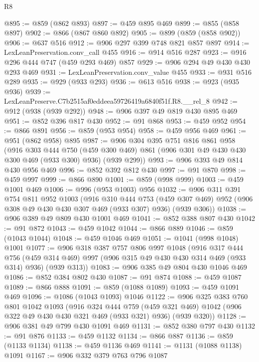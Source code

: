 \begin{lexlean}{R8}
\begin{coremodule}
@895 := @859 (@862 @893)
@897 := @459 @895 @469
@899 := @855 (@858 @897)
@902 := @866 (@867 @860 @892)
@905 := @899 (@859 (@858 @902))
@906 := @637 @516
@912 := @906 @297 @399 @748 @821 @857 @897
@914 := LexLeanPreservation.conv_call @455
@916 := @914 @516 @287
@923 := @916 @296 @444 @747 (@459 @293 @469) @857
@929 := @906 @294 @49 @430 @430 @293 @469
@931 := LexLeanPreservation.conv_value @455
@933 := @931 @516 @289
@935 := @929 (@933 @293)
@936 := @613 @516
@938 := @923 (@935 @936)
@939 := LexLeanPreserve.C7b2515af0eddeea59726419a6840f51f.R8.__rel_8
@942 := @912 (@938 (@939 @292))
@948 := @906 @397 @49 @819 @430 @895 @469
@951 := @852 @396 @817 @430
@952 := @91 @868
@953 := @459 @952
@954 := @866 @891
@956 := @859 (@953 @954)
@958 := @459 @956 @469
@961 := @951 (@862 @958) @895
@987 := @906
    @304
    @395
    @751
    @816
    @861
    @958
    (@916
      @303
      @444
      @750
      (@459 @300 @469)
      @861
      (@906 @301 @49 @430 @430 @300 @469 (@933 @300) @936)
      (@939 @299))
@993 := @906 @393 @49 @814 @430 @956 @469
@996 := @852 @392 @812 @430
@997 := @91 @870
@998 := @459 @997
@999 := @866 @890
@1001 := @859 (@998 @999)
@1003 := @459 @1001 @469
@1006 := @996 (@953 @1003) @956
@1032 := @906
    @311
    @391
    @754
    @811
    @952
    @1003
    (@916
      @310
      @444
      @753
      (@459 @307 @469)
      @952
      (@906 @308 @49 @430 @430 @307 @469 (@933 @307) @936)
      (@939 @306))
@1038 := @906 @389 @49 @809 @430 @1001 @469
@1041 := @852 @388 @807 @430
@1042 := @91 @872
@1043 := @459 @1042
@1044 := @866 @889
@1046 := @859 (@1043 @1044)
@1048 := @459 @1046 @469
@1051 := @1041 (@998 @1048) @1001
@1077 := @906
    @318
    @387
    @757
    @806
    @997
    @1048
    (@916
      @317
      @444
      @756
      (@459 @314 @469)
      @997
      (@906 @315 @49 @430 @430 @314 @469 (@933 @314) @936)
      (@939 @313))
@1083 := @906 @385 @49 @804 @430 @1046 @469
@1086 := @852 @384 @802 @430
@1087 := @91 @874
@1088 := @459 @1087
@1089 := @866 @888
@1091 := @859 (@1088 @1089)
@1093 := @459 @1091 @469
@1096 := @1086 (@1043 @1093) @1046
@1122 := @906
    @325
    @383
    @760
    @801
    @1042
    @1093
    (@916
      @324
      @444
      @759
      (@459 @321 @469)
      @1042
      (@906 @322 @49 @430 @430 @321 @469 (@933 @321) @936)
      (@939 @320))
@1128 := @906 @381 @49 @799 @430 @1091 @469
@1131 := @852 @380 @797 @430
@1132 := @91 @876
@1133 := @459 @1132
@1134 := @866 @887
@1136 := @859 (@1133 @1134)
@1138 := @459 @1136 @469
@1141 := @1131 (@1088 @1138) @1091
@1167 := @906
    @332
    @379
    @763
    @796
    @1087

\end{coremodule}
\end{lexlean}
